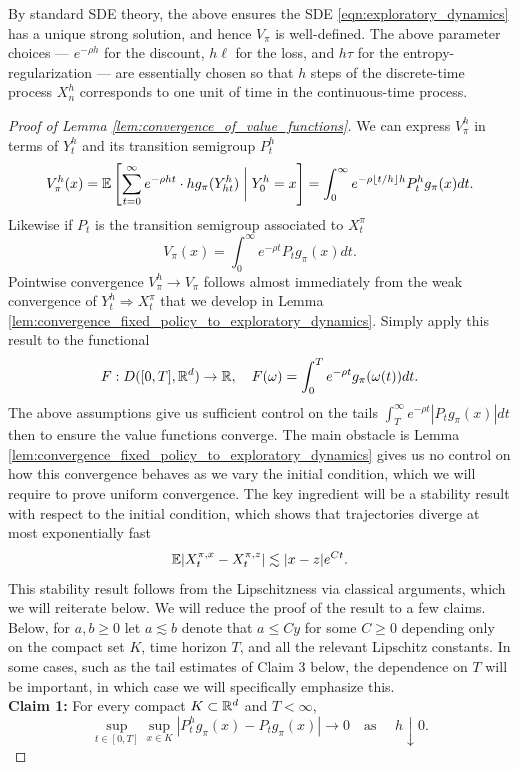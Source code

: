 	By standard SDE theory, the above ensures the SDE \eqref{eqn:exploratory_dynamics}
	has a unique strong solution, and hence $V_\pi$ is well-defined. The above parameter choices --- $e^{-\rho h}$ for the discount, $h\ell$ for the loss, and
	$h \tau$ for the entropy-regularization --- are essentially chosen so that $h$ steps of the discrete-time process $X^{h}_n$ corresponds to one unit of time
	in the continuous-time process.

\begin{proof}[Proof of Lemma \ref{lem:convergence_of_value_functions}]
	We can express $V_\pi^h$ in terms of $Y^h_t$ and its transition semigroup $P^h_t$
	\[V_\pi^h(x) = \mathbb{E}\left[ \sum_{t=0}^\infty e^{-\rho h t} \cdot h g_\pi(Y^h_{ht}) \;\bigg\vert\; Y^h_0 = x\right] = \int_0^\infty e^{-\rho \lfloor t/h \rfloor h} P_t^hg_\pi(x) dt.\]
	\noindent Likewise if $P_t$ is the transition semigroup associated to $X_t^\pi$
	\[V_\pi(x) = \int_0^\infty e^{-\rho t} P_tg_\pi(x) dt.\]
	\noindent Pointwise convergence $V^h_\pi \to V_\pi$ follows almost immediately from the weak
	convergence of $Y^h_t \Rightarrow X^\pi_t$ that we develop in Lemma \ref{lem:convergence_fixed_policy_to_exploratory_dynamics}. Simply apply this result to the functional
	\[F:D([0,T], \mathbb{R}^d) \to \mathbb{R}, \quad F(\omega) = \int_0^T e^{-\rho t} g_\pi(\omega(t)) dt.\]
	The above assumptions give us sufficient control on the tails $\int_T^\infty e^{-\rho t} |P_t g_\pi(x)| dt$ then to ensure the value
	functions converge. The main obstacle is Lemma \ref{lem:convergence_fixed_policy_to_exploratory_dynamics} gives us no control on how this convergence
	behaves as we vary the initial condition, which we will require to prove uniform convergence. The key ingredient will be a stability result
	with respect to the initial condition, which shows that trajectories diverge at most exponentially fast
	\[\mathbb{E} |X_t^{\pi, x} - X_t^{\pi, z}| \lesssim |x-z| e^{Ct}.\]
	This stability result follows from the Lipschitzness via classical arguments, which we will reiterate below.
	We will reduce the proof of the result to a few claims. Below, for $a,b \geq 0$ let $a \lesssim b$ denote that $a \leq Cy$ for some $C \geq 0$ depending
	only on the compact set $K$, time horizon $T$, and all the relevant Lipschitz constants. In some cases, such as the tail estimates of Claim 3 below,
	the dependence on $T$ will be important, in which case we will specifically emphasize this. \\

	\noindent \textbf{Claim 1:} For every compact $K\subset \mathbb{R}^d$ and $T<\infty$,
    \[
		\sup_{t\in[0,T]}\sup_{x\in K}|P_t^h g_\pi(x)-P_t g_\pi(x)|\to 0
		\quad \text{as } \quad h\downarrow 0.
		\]


\end{proof}
